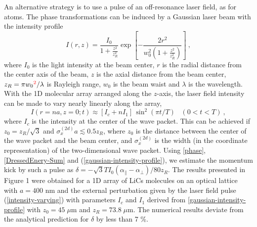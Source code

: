 An alternative strategy is to use a pulse of an
off-resonance laser field, as for atoms. The phase transformations can be induced
by a Gaussian laser beam with the intensity profile
\begin{equation}
I(r, z) = \frac{I_0}{1+
\frac{z^2}{z_R^2}}\exp\left[-\frac{2r^2}{w_0^2\left (1+
\frac{z^2}{z_R^2}\right) }\right] \ ,
\label{gaussian-intensity-profile}
\end{equation}
where $I_0$ is the light intensity at the beam center, $r$ is the
radial distance from the center axis of the beam, $z$ is the axial
distance from the beam center,  $z_R=\pi w_0{\color{red}^2}/\lambda$ is
Rayleigh range, $w_0$ is the beam waist and $\lambda$ is the wavelength.
With the 1D molecular array arranged along the $z$-axis, the laser field intensity
can be made to vary nearly linearly along the array,
\begin{equation}
I(r=na, z=0; t) \approx [I_{c} + n I_1 ] \, \sin^{2}(\pi t/T) \; \;\; (0 < t <
T) \ , \label{intensity-varying}
\end{equation}
where $I_{c}$ is the intensity at the center of the wave packet.
This can be achieved if $z_0 = z_R/\sqrt{3}$ and ${\sigma}_x^{(2d)}
a\lesssim 0.5 z_R$, where $z_0$ is the distance between
the center of the wave packet and the beam center, and ${\sigma}_x^{(2d)}$ is the width (in the coordinate representation) of the two-dimensional wave packet. Using \autoref{phase}, \autoref{DressedEnery-Sum} and (\ref{gaussian-intensity-profile}), we estimate the momentum kick by such a pulse as $
\delta = -\sqrt{3}T I_{0} (\alpha_{\|}-\alpha_\perp) / 80 z_R
$.
The results presented in Figure 1 were obtained for a 1D array of LiCs molecules on an optical lattice with $a=400$ nm and the external perturbation
given by the laser field pulse (\ref{intensity-varying}) with parameters $I_c$ and $I_1$ derived from  \autoref{gaussian-intensity-profile} with $z_0 = 45\; \mu$m and
$z_R=73.8\; \mu$m. The numerical results deviate from the analytical prediction for $\delta$ by less than 7 \%.

